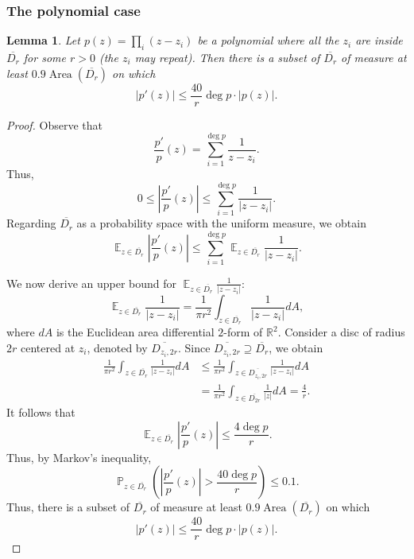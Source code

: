 \documentclass[reqno]{amsart}
\theoremstyle{plain}
\newtheorem{Lem}[Cor]{Lemma}
\theoremstyle{definition}
\theoremstyle{remark}
\theoremstyle{plain}
\begin{document}
\subsubsection{The polynomial case}

\begin{Lem}\label{Lemma derivative-function ratio polynomial}
Let $p(z)=\prod_i(z-z_i)$ be a polynomial where all the ${z_i}$ are inside $\overline{D_r}$ for some $r>0$ (the $z_i$ may repeat). Then there is a subset of $\overline{D_r}$ of measure at least $0.9\operatorname{Area}\left(\overline{D_r}\right)$ on which
\[
    |p'(z)|\leq\frac{40}{r}\deg p\cdot|p(z)|
.\]
\end{Lem}

\begin{proof}
Observe that
\[
    \frac{p'}{p}(z)=\sum_{i=1}^{\deg p}\frac1{z-z_i}
.\]
Thus,
\[
    0\leq\left|\frac{p'}{p}(z)\right|\leq\sum_{i=1}^{\deg p}\frac1{|z-z_i|}
.\]
Regarding $\overline{D_r}$ as a probability space with the uniform measure, we obtain
\[
    \operatorname{\mathbb E}_{z\in \overline{D_r}}\left|\frac{p'}{p}(z)\right|\leq\sum_{i=1}^{\deg p}\operatorname{\mathbb E}_{z\in \overline{D_r}}\frac1{|z-z_i|}
.\]

We now derive an upper bound for $\operatorname{\mathbb E}_{z\in \overline{D_r}}\frac1{|z-z_i|}$:
\[
    \operatorname{\mathbb E}_{z\in \overline{D_r}}\frac1{|z-z_i|}=\frac1{\pi r^2}\int_{z\in \overline{D_r}}\frac1{|z-z_i|}dA
,\]
where $dA$ is the Euclidean area differential $2$-form of $\mathbb R^2$.
Consider a disc of radius $2r$ centered at $z_i$, denoted by $\overline{D_{z_i,2r}}$. Since $\overline{D_{z_i,2r}}\supseteq \overline{D_r}$, we obtain
\begin{align*}
    \frac1{\pi r^2}\int_{z\in \overline{D_r}}\frac1{|z-z_i|}dA
        &\leq
    \frac1{\pi r^2}\int_{z\in \overline{D_{z_i,2r}}}\frac1{|z-z_i|}dA
        \\&=
    \frac1{\pi r^2}\int_{z\in\overline{D_{2r}}}\frac1{|z|}dA
        =
    \frac4{r}
.\end{align*}
It follows that
\[
    \operatorname{\mathbb E}_{z\in \overline{D_r}}\left|\frac{p'}{p}(z)\right|\leq\frac{4\deg p}{r}
.\]
Thus, by Markov's inequality,
\[
    \operatorname{\mathbb P}_{z\in \overline{D_r}}\left(\left|\frac{p'}{p}(z)\right|>\frac{40\deg p}{r}\right)\leq 0.1
.\]
Thus, there is a subset of $\overline{D_r}$ of measure at least $0.9\operatorname{Area}\left(\overline{D_r}\right)$ on which
\[
|p'(z)|\leq\frac{40}{r}\deg p\cdot|p(z)|
.\]
\end{proof}
\end{document}
